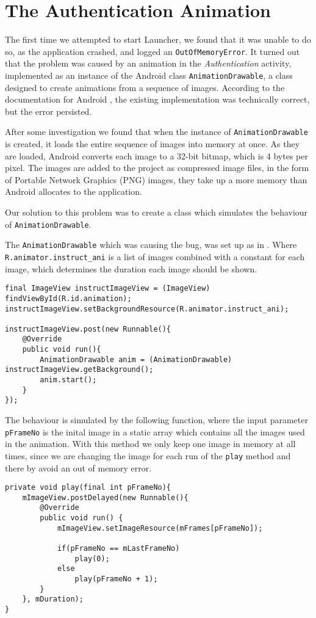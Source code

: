 \section{The Authentication Animation}
The first time we attempted to start Launcher, we found that it was unable to do so, as the application crashed, and logged an \lstinline{OutOfMemoryError}.
It turned out that the problem was caused by an animation in the \textit{Authentication} activity, implemented as an instance of the Android class \lstinline{AnimationDrawable}, a class designed to create animations from a sequence of images.
According to the documentation for Android \cite{androidreference}, the existing implementation was technically correct, but the error persisted.

After some investigation we found that when the instance of \lstinline{AnimationDrawable} is created, it loads the entire sequence of images into memory at once.
As they are loaded, Android converts each image to a 32-bit bitmap, which is 4 bytes per pixel.
The images are added to the project as compressed image files, in the form of Portable Network Graphics (PNG) images, they take up a more memory than Android allocates to the application.

Our solution to this problem was to create a class which simulates the behaviour of \lstinline{AnimationDrawable}.

The \lstinline{AnimationDrawable} which was causing the bug, was set up as in . Where \lstinline{R.animator.instruct_ani} is a list of images combined with a constant for each image, which determines the duration each image should be shown.
\begin{lstlisting}
final ImageView instructImageView = (ImageView) findViewById(R.id.animation);
instructImageView.setBackgroundResource(R.animator.instruct_ani);

instructImageView.post(new Runnable(){
    @Override
    public void run(){
        AnimationDrawable anim = (AnimationDrawable) instructImageView.getBackground();
        anim.start();
    }
});
\end{lstlisting}

The behaviour is simulated by the following function, where the input parameter \lstinline{pFrameNo} is the inital image in a static array which contains all the images used in the animation. 
With this method we only keep one image in memory at all times, since we are changing the image for each run of the \lstinline{play} method and there by avoid an out of memory error.
\begin{lstlisting}
private void play(final int pFrameNo){
    mImageView.postDelayed(new Runnable(){
        @Override
        public void run() {                    
            mImageView.setImageResource(mFrames[pFrameNo]);

            if(pFrameNo == mLastFrameNo)
                play(0);
            else
                play(pFrameNo + 1);
        }
    }, mDuration);
}        
\end{lstlisting}